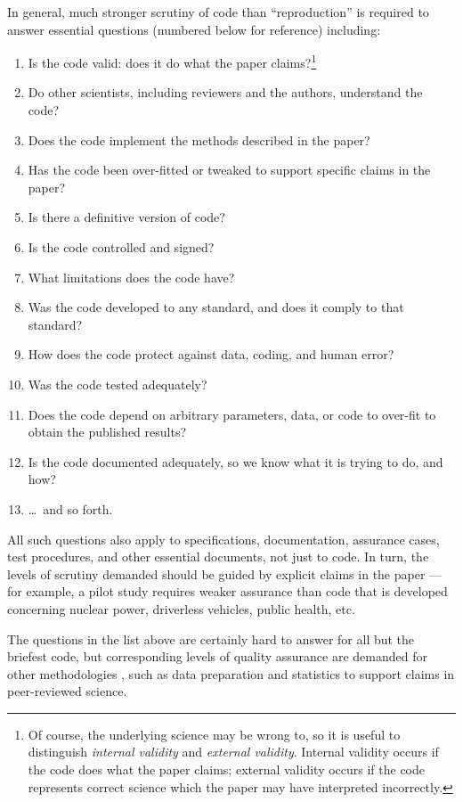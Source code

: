 \documentclass{comjnl}
\begin{document}
In general, much stronger scrutiny of code than ``reproduction'' is required to answer essential questions (numbered below for reference) including:

\begin{enumerate}
\raggedright
\item Is the code valid: does it do what the paper claims?\footnote{Of course, the underlying science may be wrong to, so it is useful to distinguish \emph{internal validity\/} and \emph{external validity}. Internal validity occurs if the code does what the paper claims; external validity occurs if the code represents correct science which the paper may have interpreted incorrectly.}
\item Do other scientists, including reviewers and the authors, understand the code?
\item Does the code implement the methods described in the paper?
\item Has the code been over-fitted or tweaked to support specific claims in the paper?
\item Is there a definitive version of code?
\item Is the code controlled and signed?
\item What limitations does the code have?
\item Was the code developed to any standard, and does it comply to that standard?
\item How does the code protect against data, coding, and human error?
\item Was the code tested adequately?
\item Does the code depend on arbitrary parameters, data, or code to over-fit to obtain the published results?
\item Is the code documented adequately, so we know what it is trying to do, and how?
\item \ldots\ and so forth. 
\end{enumerate}

All such questions also apply to specifications, documentation, assurance cases, test procedures, and other essential documents, not just to code. In turn, the levels of scrutiny demanded should be guided by explicit claims in the paper \cite{essence-of-software} --- for example, a pilot study requires weaker assurance than code that is developed concerning nuclear power, driverless vehicles, public health, etc. 

The questions in the list above are certainly hard to answer for all but the briefest code, but corresponding levels of quality assurance are demanded for other methodologies \cite{notebooks,popper-conjectures-refutations,tripod,prisma,nih-policy,nih-nature}, such as data preparation and statistics to support claims in peer-reviewed science. 
\end{document}
